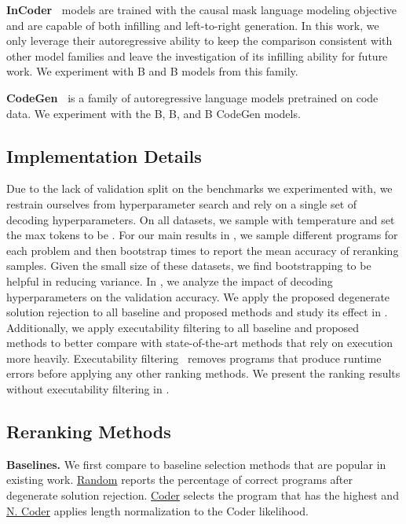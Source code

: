 \documentclass[nohyperref]{article}
\theoremstyle{plain}
\theoremstyle{definition}
\theoremstyle{remark}
\renewcommand{\paragraph}[1]{
     \textbf{#1} 
 }
\begin{document}
\paragraph{InCoder~\citep{incoder}} models are trained with the causal mask language modeling objective and are capable of both infilling and left-to-right generation.
In this work, we only leverage their autoregressive ability to keep the comparison consistent with other model families and leave the investigation of its infilling ability for future work.
We experiment with B and B models from this family.

\paragraph{CodeGen~\citep{codegen}} is a family of autoregressive language models pretrained on code data. We experiment with the B, B, and B CodeGen models.

\subsection{Implementation Details}
Due to the lack of validation split on the benchmarks we experimented with, we restrain ourselves from hyperparameter search and rely on a single set of decoding hyperparameters.
On all datasets, we sample with temperature  and set the max tokens to be .
For our main results in , we sample  different programs for each problem and then bootstrap  times to report the mean accuracy of reranking  samples.
Given the small size of these datasets, we find bootstrapping to be helpful in reducing variance.
In , we analyze the impact of decoding hyperparameters on the validation accuracy.
We apply the proposed degenerate solution rejection to all baseline and proposed methods and study its effect in .
Additionally, we apply executability filtering to all baseline and proposed methods to better compare with state-of-the-art methods that rely on execution more heavily.
Executability filtering~\citep{mbr} removes programs that produce runtime errors before applying any other ranking methods.
We present the ranking results without executability filtering in .

\subsection{Reranking Methods}
\paragraph{Baselines.} We first compare to baseline selection methods that are popular in existing work. \underline{Random} reports the percentage of correct programs after degenerate solution rejection.
\underline{Coder} selects the program that has the highest  and \underline{N. Coder} applies length normalization to the Coder likelihood.
\end{document}
